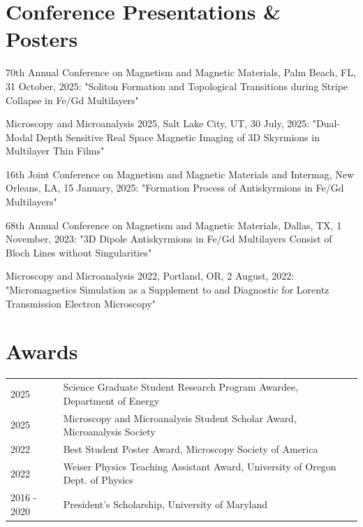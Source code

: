 \documentclass[a4paper,12pt]{article}
\begin{document}
\section{Conference Presentations \& Posters}
70th Annual Conference on Magnetism and Magnetic Materials, Palm Beach, FL, 31 October, 2025: "Soliton Formation and Topological Transitions during Stripe Collapse in Fe/Gd Multilayers"

Microscopy and Microanalysis 2025, Salt Lake City, UT, 30 July, 2025: "Dual-Modal Depth Sensitive Real Space Magnetic Imaging of 3D Skyrmions in Multilayer Thin Films"

16th Joint Conference on Magnetism and Magnetic Materials and Intermag, New Orleans, LA, 15 January, 2025: "Formation Process of Antiskyrmions in Fe/Gd Multilayers"

68th Annual Conference on Magnetism and Magnetic Materials, Dallas, TX, 1 November, 2023: "3D Dipole Antiskyrmions in Fe/Gd Multilayers Consist of Bloch Lines without Singularities"


Microscopy and Microanalysis 2022, Portland, OR, 2 August, 2022: "Micromagnetics Simulation as a Supplement to and Diagnostic for Lorentz Transmission Electron Microscopy"

\section{Awards}
\begin{tabularx}{\linewidth}{@{}l X@{}}	
2025 & Science Graduate Student Research Program Awardee, Department of Energy\\
2025 & Microscopy and Microanalysis Student Scholar Award, Microanalysis Society \\

2022 & Best Student Poster Award, Microscopy Society of America \\

2022 & Weiser Physics Teaching Assistant Award, University of Oregon Dept. of Physics \\

2016 - 2020 & President’s Scholarship, University of Maryland \\ 
\end{tabularx}
\end{document}
